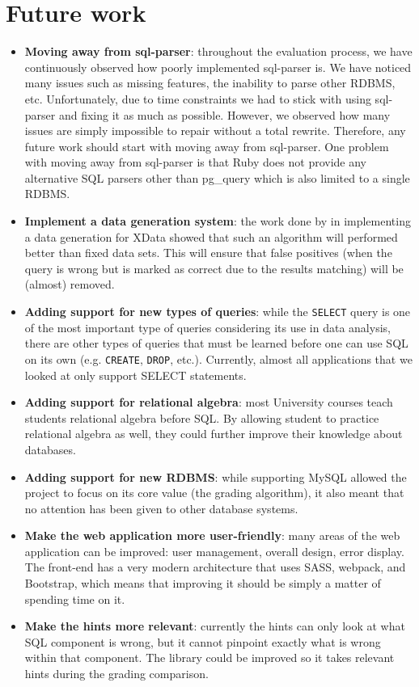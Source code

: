 \section{Future work}
\begin{itemize}
    \item \textbf{Moving away from sql-parser}: throughout the evaluation process, we have continuously observed how poorly implemented sql-parser is. We have noticed many issues such as missing features, the inability to parse other RDBMS, etc. Unfortunately, due to time constraints we had to stick with using sql-parser and fixing it as much as possible. However, we observed how many issues are simply impossible to repair without a total rewrite. Therefore, any future work should start with moving away from sql-parser. One problem with moving away from sql-parser is that Ruby does not provide any alternative SQL parsers other than pg\_query which is also limited to a single RDBMS.
    \item \textbf{Implement a data generation system}: the work done by \citet{lit:xdata_d} in implementing a data generation for XData showed that such an algorithm will performed better than fixed data sets. This will ensure that false positives (when the query is wrong but is marked as correct due to the results matching) will be (almost) removed.
    \item \textbf{Adding support for new types of queries}: while the \texttt{SELECT} query is one of the most important type of queries considering its use in data analysis, there are other types of queries that must be learned before one can use SQL on its own (e.g. \texttt{CREATE}, \texttt{DROP}, etc.). Currently, almost all applications that we looked at only support SELECT statements.
    \item \textbf{Adding support for relational algebra}: most University courses teach students relational algebra before SQL. By allowing student to practice relational algebra as well, they could further improve their knowledge about databases.
    \item \textbf{Adding support for new RDBMS}: while supporting MySQL allowed the project to focus on its core value (the grading algorithm), it also meant that no attention has been given to other database systems.
    \item \textbf{Make the web application more user-friendly}: many areas of the web application can be improved: user management, overall design, error display. The front-end has a very modern architecture that uses SASS, webpack, and Bootstrap, which means that improving it should be simply a matter of spending time on it.
    \item \textbf{Make the hints more relevant}: currently the hints can only look at what SQL component is wrong, but it cannot pinpoint exactly what is wrong within that component. The library could be improved so it takes relevant hints during the grading comparison.
\end{itemize}